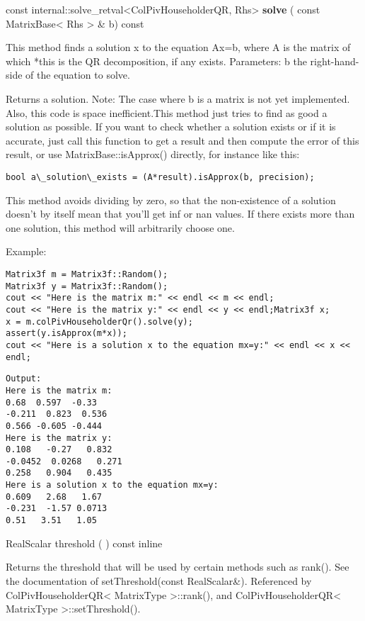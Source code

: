 \vspace{0.3cm}
const internal::solve\_retval<ColPivHouseholderQR, Rhs> \textbf{solve}  ( const MatrixBase< Rhs > \&  b)  const 

This method finds a solution x to the equation Ax=b, where A is the matrix of which *this is the QR decomposition, if any exists.
Parameters: b the right-hand-side of the equation to solve. 

Returns a solution.
Note: The case where b is a matrix is not yet implemented. Also, this code is space inefficient.This method just tries to find as good a solution as possible. If you want to check whether a solution exists or if it is accurate, just call this function to get a result and then compute the error of this result, or use MatrixBase::isApprox() directly, for instance like this:
\begin{verbatim}
bool a\_solution\_exists = (A*result).isApprox(b, precision); 
\end{verbatim}
This method avoids dividing by zero, so that the non-existence of a solution doesn't by itself mean that you'll get inf or nan values.
If there exists more than one solution, this method will arbitrarily choose one.


Example:
\begin{lstlisting}
Matrix3f m = Matrix3f::Random();
Matrix3f y = Matrix3f::Random();
cout << "Here is the matrix m:" << endl << m << endl;
cout << "Here is the matrix y:" << endl << y << endl;Matrix3f x;
x = m.colPivHouseholderQr().solve(y);
assert(y.isApprox(m*x));
cout << "Here is a solution x to the equation mx=y:" << endl << x << endl;
\end{lstlisting}

\begin{verbatim}
Output:
Here is the matrix m:
0.68  0.597  -0.33
-0.211  0.823  0.536
0.566 -0.605 -0.444
Here is the matrix y:
0.108   -0.27   0.832
-0.0452  0.0268   0.271
0.258   0.904   0.435
Here is a solution x to the equation mx=y:
0.609   2.68   1.67
-0.231  -1.57 0.0713
0.51   3.51   1.05
\end{verbatim}


RealScalar threshold  ( )  const 
inline  

Returns the threshold that will be used by certain methods such as rank().
See the documentation of setThreshold(const RealScalar\&). 
Referenced by ColPivHouseholderQR< MatrixType >::rank(), and ColPivHouseholderQR< MatrixType >::setThreshold().





